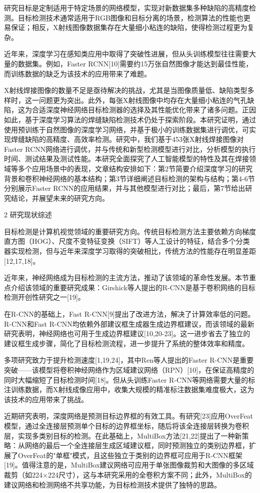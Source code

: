 研究目标是定制适用于特定场景的网络模型，实现对新数据集多种缺陷的高精度检测。目标检测技术通常适用于RGB图像和目标分离的场景，检测算法的性能也更易保证；相反，X射线图像数据集存在大量细小粘连的缺陷，使得检测过程更为复杂。

近年来，深度学习在感知类应用中取得了突破性进展，但从头训练模型往往需要大量的数据集。例如，Faster
RCNN{[}10{]}需要约15万张自然图像才能达到最佳性能，而训练数据的缺乏为该技术的应用带来了难题。

X射线焊接图像的数量不足是亟待解决的挑战，尤其是当图像质量低、缺陷类型多样时，这一问题更为突出。此外，每张X射线图像中均存在大量细小粘连的气孔缺陷，这为合适深度神经网络目标检测器的选择及其性能优化带来了诸多问题。正因如此，基于深度学习算法的焊缝缺陷检测技术仍处于探索阶段。本研究证明，通过使用预训练于自然图像的深度学习网络，并基于极小的训练数据集进行调优，可实现焊缝缺陷的高精度、高效率检测。研究中，我们基于453张X射线焊接图像对Faster
RCNN网络进行调优，并与传统和新型检测模型进行对比，分析模型的执行时间、测试结果及测试性能。本研究全面探究了人工智能模型的特性及其在焊接领域等多个应用场景中的表现，文章结构安排如下：第2节简要介绍深度学习的研究背景和卷积神经网络的基本结构；第3节详细阐述目标检测的架构与结构；第4-6节分别展示Faster
RCNN的应用结果，并与其他模型进行对比；最后，第7节给出研究结论，并展望未来的研究方向。

2 研究现状综述

目标检测是计算机视觉领域的重要研究方向。传统目标检测方法主要依赖方向梯度直方图（HOG）、尺度不变特征变换（SIFT）等人工设计的特征，结合多个分类器实现检测，但与近年来深度学习取得的突破相比，传统方法的性能存在明显差距{[}12,17,18{]}。

近年来，神经网络成为目标检测的主流方法，推动了该领域的革命性发展。本节重点介绍该领域的重要研究成果：Girshick等人提出的R-CNN是基于卷积网络的目标检测开创性研究之一{[}19{]}。

在R-CNN的基础上，Fast
R-CNN{[}9{]}提出了改进方法，解决了计算效率低的问题。R-CNN和Fast
R-CNN均依赖外部建议框生成器生成边界框建议，而该领域的最新研究表明，神经网络也可用于生成边界框建议{[}10,20-23{]}。这一进步省去了独立的建议框生成步骤，简化了目标检测流程，进一步提升了系统的整体效率和精度。

多项研究致力于提升检测速度{[}1,19,24{]}，其中Ren等人提出的Faster
R-CNN是重要突破------该模型将卷积神经网络作为区域建议网络（RPN）{[}10{]}，在保证高精度的同时大幅缩短了目标检测时间{[}18{]}。但从头训练Faster
R-CNN等网络需要大量的标注训练数据，而X射线成像应用中，收集大规模的精准标注数据集难度极大，这为该技术的应用带来了挑战。

近期研究表明，深度网络是预测目标边界框的有效工具。有研究{[}23{]}应用OverFeat模型，通过全连接层预测单个目标的边界框坐标，随后将该全连接层转换为卷积层，实现多类别目标的检测。在此基础上，MultiBox方法{[}21,22{]}提出了一种新策略：从网络的最后一个全连接层生成区域建议框，同时预测独立的类别边界框，扩展了OverFeat的"单框"模式，且这些独立于类别的边界框可应用于R-CNN框架{[}19{]}。值得注意的是，MultiBox建议网络可应用于单张图像裁剪和大图像的多区域裁剪（如224×224尺寸），这与本研究采用的全卷积方案不同；此外，MultiBox的建议网络和检测网络不共享功能，为目标检测技术提供了独特的思路。

